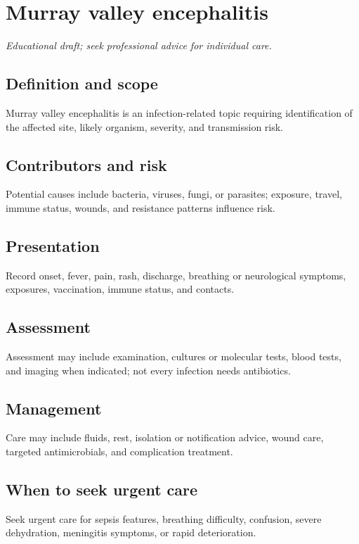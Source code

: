 \chapter{Murray valley encephalitis}

\medskip
\noindent\textit{Educational draft; seek professional advice for individual care.}

\section*{Definition and scope}
Murray valley encephalitis is an infection-related topic requiring identification of the affected site, likely organism, severity, and transmission risk.

\section*{Contributors and risk}
Potential causes include bacteria, viruses, fungi, or parasites; exposure, travel, immune status, wounds, and resistance patterns influence risk.

\section*{Presentation}
Record onset, fever, pain, rash, discharge, breathing or neurological symptoms, exposures, vaccination, immune status, and contacts.

\section*{Assessment}
Assessment may include examination, cultures or molecular tests, blood tests, and imaging when indicated; not every infection needs antibiotics.

\section*{Management}
Care may include fluids, rest, isolation or notification advice, wound care, targeted antimicrobials, and complication treatment.

\section*{When to seek urgent care}
Seek urgent care for sepsis features, breathing difficulty, confusion, severe dehydration, meningitis symptoms, or rapid deterioration.

